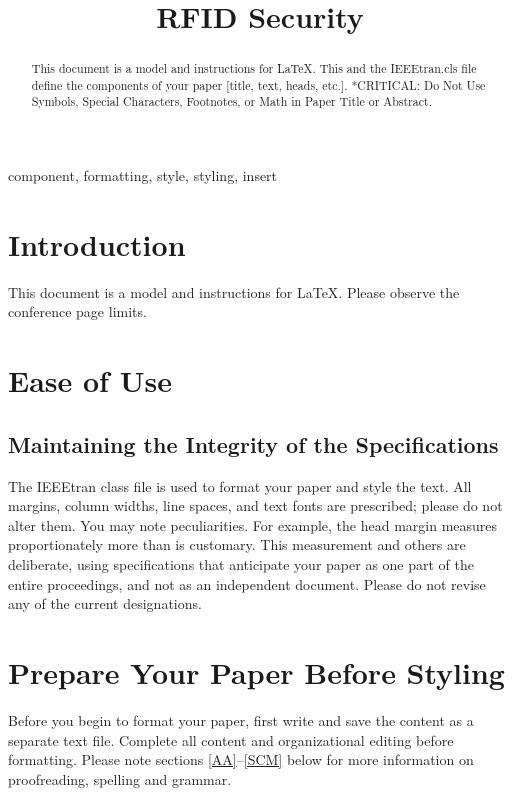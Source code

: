 \documentclass[conference]{IEEEtran}
\begin{document}
\title{RFID Security}


\author{
}

\maketitle

\begin{abstract}
This document is a model and instructions for \LaTeX.
This and the IEEEtran.cls file define the components of your paper [title, text, heads, etc.]. *CRITICAL: Do Not Use Symbols, Special Characters, Footnotes, 
or Math in Paper Title or Abstract.
\end{abstract}

\begin{IEEEkeywords}
component, formatting, style, styling, insert
\end{IEEEkeywords}

\section{Introduction}
This document is a model and instructions for \LaTeX.
Please observe the conference page limits. 

\section{Ease of Use}

\subsection{Maintaining the Integrity of the Specifications}

The IEEEtran class file is used to format your paper and style the text. All margins, 
column widths, line spaces, and text fonts are prescribed; please do not 
alter them. You may note peculiarities. For example, the head margin
measures proportionately more than is customary. This measurement 
and others are deliberate, using specifications that anticipate your paper 
as one part of the entire proceedings, and not as an independent document. 
Please do not revise any of the current designations.

\section{Prepare Your Paper Before Styling}
Before you begin to format your paper, first write and save the content as a 
separate text file. Complete all content and organizational editing before 
formatting. Please note sections \ref{AA}--\ref{SCM} below for more information on 
proofreading, spelling and grammar.
\end{document}
